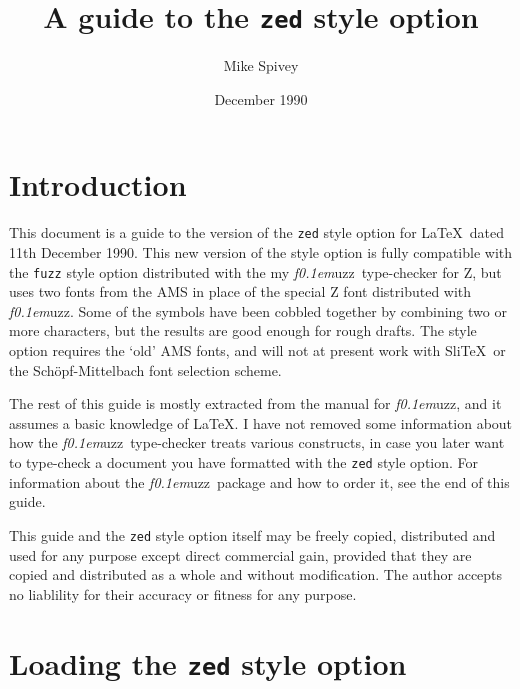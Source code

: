 \documentclass{article}
\def\fuzz{{\large\it f\kern0.1em}{\normalsize\sc uzz}}
\begin{document}
\title{A guide to the {\tt zed} style option}
\author{Mike Spivey}
\date{December 1990}
\maketitle

\section{Introduction}

This document is a guide to the version of the {\tt zed} style option
for \LaTeX\ dated 11th December 1990.  This new version of the style
option is fully compatible with the {\tt fuzz} style option
distributed with the my \fuzz\ type-checker for Z, but uses two fonts
from the AMS in place of the special Z font distributed with
\fuzz.  Some of the symbols have been cobbled together by combining
two or more characters, but the results are good enough for rough
drafts. The style option requires the `old' AMS fonts, and will not at
present work with Sli\TeX\ or the Sch\"opf-Mittelbach font selection
scheme.

The rest of this guide is mostly extracted from the manual for \fuzz,
and it assumes a basic knowledge of \LaTeX.  I have not removed some
information about how the \fuzz\ type-checker treats various
constructs, in case you later want to type-check a document you have
formatted with the {\tt zed} style option. For information about the
\fuzz\ package and how to order it, see the end of this guide.

This guide and the {\tt zed} style option itself may be freely copied,
distributed and used for any purpose except direct commercial gain,
provided that they are copied and distributed as a whole and without
modification. The author accepts no liablility for their accuracy or
fitness for any purpose.

\section{Loading the {\tt zed} style option}
\end{document}
